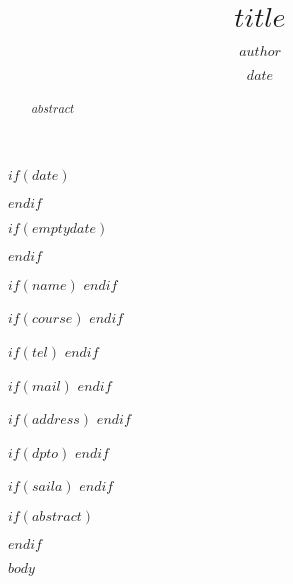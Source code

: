 \documentclass[$if(classoptions)$$classoptions$$endif$]{ifirak2}
\begin{document}
\title{$title$}
\author{$author$}

$if(date)$
\date{$date$}
$endif$

$if(emptydate)$
\date{}
$endif$

$if(name)$
$endif$

$if(course)$
$endif$

$if(tel)$
$endif$

$if(mail)$
$endif$

$if(address)$
$endif$

$if(dpto)$
$endif$

$if(saila)$
$endif$

\maketitle
$if(abstract)$
\begin{abstract}
$abstract$
\end{abstract}
$endif$


$body$
\end{document}
